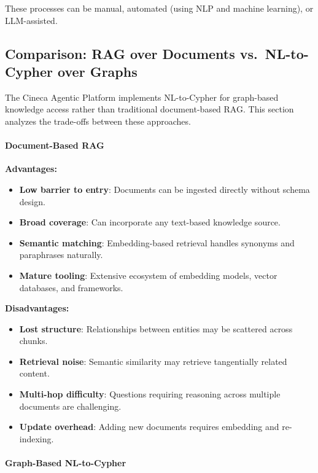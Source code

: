 These processes can be manual, automated (using NLP and machine learning), or LLM-assisted.

\subsection{Comparison: RAG over Documents vs.\ NL-to-Cypher over Graphs}

The Cineca Agentic Platform implements NL-to-Cypher for graph-based knowledge access rather than traditional document-based RAG. This section analyzes the trade-offs between these approaches.

\paragraph{Document-Based RAG}

\textbf{Advantages:}
\begin{itemize}
    \item \textbf{Low barrier to entry}: Documents can be ingested directly without schema design.
    \item \textbf{Broad coverage}: Can incorporate any text-based knowledge source.
    \item \textbf{Semantic matching}: Embedding-based retrieval handles synonyms and paraphrases naturally.
    \item \textbf{Mature tooling}: Extensive ecosystem of embedding models, vector databases, and frameworks.
\end{itemize}

\textbf{Disadvantages:}
\begin{itemize}
    \item \textbf{Lost structure}: Relationships between entities may be scattered across chunks.
    \item \textbf{Retrieval noise}: Semantic similarity may retrieve tangentially related content.
    \item \textbf{Multi-hop difficulty}: Questions requiring reasoning across multiple documents are challenging.
    \item \textbf{Update overhead}: Adding new documents requires embedding and re-indexing.
\end{itemize}

\paragraph{Graph-Based NL-to-Cypher}

